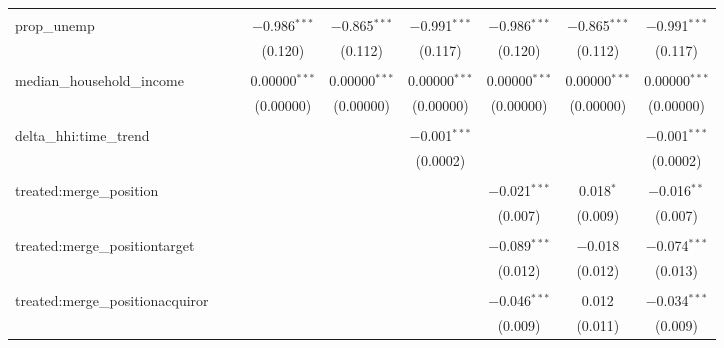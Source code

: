 \begin{table}[H]
{\begin{tabular}{@{\extracolsep{5pt}}lcccccccc}
   & & & & & & & & \\  

  prop\_unemp &  &  & $-$0.986$^{***}$ & $-$0.865$^{***}$ & $-$0.991$^{***}$ & $-$0.986$^{***}$ & $-$0.865$^{***}$ & $-$0.991$^{***}$ \\  

   &  &  & (0.120) & (0.112) & (0.117) & (0.120) & (0.112) & (0.117) \\  

   & & & & & & & & \\  

  median\_household\_income &  &  & 0.00000$^{***}$ & 0.00000$^{***}$ & 0.00000$^{***}$ & 0.00000$^{***}$ & 0.00000$^{***}$ & 0.00000$^{***}$ \\  

   &  &  & (0.00000) & (0.00000) & (0.00000) & (0.00000) & (0.00000) & (0.00000) \\  

   & & & & & & & & \\  

  delta\_hhi:time\_trend &  &  &  &  & $-$0.001$^{***}$ &  &  & $-$0.001$^{***}$ \\  

   &  &  &  &  & (0.0002) &  &  & (0.0002) \\  

   & & & & & & & & \\  

  treated:merge\_position &  &  &  &  &  & $-$0.021$^{***}$ & 0.018$^{*}$ & $-$0.016$^{**}$ \\  

   &  &  &  &  &  & (0.007) & (0.009) & (0.007) \\  

   & & & & & & & & \\  

  treated:merge\_positiontarget &  &  &  &  &  & $-$0.089$^{***}$ & $-$0.018 & $-$0.074$^{***}$ \\  

   &  &  &  &  &  & (0.012) & (0.012) & (0.013) \\  

   & & & & & & & & \\  

  treated:merge\_positionacquiror &  &  &  &  &  & $-$0.046$^{***}$ & 0.012 & $-$0.034$^{***}$ \\  

   &  &  &  &  &  & (0.009) & (0.011) & (0.009) \\  


\end{tabular}}
\end{table}
